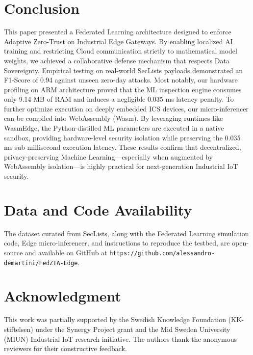 \documentclass[conference]{IEEEtran}
\begin{document}
\section{Conclusion}
This paper presented a Federated Learning architecture designed to enforce Adaptive Zero-Trust on Industrial Edge Gateways. By enabling localized AI training and restricting Cloud communication strictly to mathematical model weights, we achieved a collaborative defense mechanism that respects Data Sovereignty. Empirical testing on real-world SecLists payloads demonstrated an F1-Score of 0.94 against unseen zero-day attacks. Most notably, our hardware profiling on ARM architecture proved that the ML inspection engine consumes only 9.14 MB of RAM and induces a negligible 0.035 ms latency penalty. To further optimize execution on deeply embedded ICS devices, our micro-inferencer can be compiled into WebAssembly (Wasm). By leveraging runtimes like WasmEdge, the Python-distilled ML parameters are executed in a native sandbox, providing hardware-level security isolation while preserving the 0.035 ms sub-millisecond execution latency. These results confirm that decentralized, privacy-preserving Machine Learning—especially when augmented by WebAssembly isolation—is highly practical for next-generation Industrial IoT security.

\section*{Data and Code Availability}
The dataset curated from SecLists, along with the Federated Learning simulation code, Edge micro-inferencer, and instructions to reproduce the testbed, are open-source and available on GitHub at \texttt{https://github.com/alessandro-demartini/FedZTA-Edge}.

\section*{Acknowledgment}
This work was partially supported by the Swedish Knowledge Foundation (KK-stiftelsen) under the Synergy Project grant and the Mid Sweden University (MIUN) Industrial IoT research initiative. The authors thank the anonymous reviewers for their constructive feedback.
\end{document}
